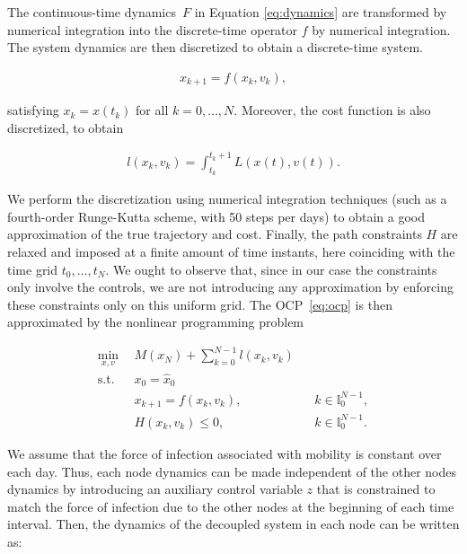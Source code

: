 The continuous-time dynamics~$F$ in Equation \eqref{eq:dynamics} are transformed by numerical integration into the discrete-time operator $f$ by numerical integration. The system dynamics are then discretized to obtain a discrete-time system.

\begin{align*}
    x_{k+1} = f(x_k,v_k),
\end{align*}

satisfying $x_k=x(t_k)$ for all $k=0,\ldots,N$. Moreover, the cost function is also discretized, to obtain

\begin{align*}
    l(x_k,v_k)=\int_{t_k}^{t_k+1} L(x(t),v(t)).
\end{align*}

We perform the discretization using numerical integration techniques (such as a fourth-order Runge-Kutta scheme, with 50 steps per days) to obtain a good approximation of the true trajectory and cost. Finally, the path constraints $H$ are relaxed and imposed at a finite amount of time instants, here coinciding with the time grid $t_0,\ldots,t_N$. We ought to observe that, since in our case the constraints only involve the controls, we are not introducing any approximation by enforcing these constraints only on this uniform grid. The OCP~\eqref{eq:ocp} is then approximated by the nonlinear programming problem

\begin{subequations}
    \begin{align}
        \min_{x,v} \ \ & M(x_N)+\sum_{k=0}^{N-1} l(x_k,v_k)  \\ 
        \mathrm{s.t.} \ \ & x_0 = \hat x_0 \\
        & x_{k+1} = f(x_k,v_k), && k\in \mathbb{I}_0^{N-1}, \\
        &H(x_k,v_k)\leq 0, && k\in \mathbb{I}_0^{N-1}.
    \end{align}
        \label{eq:ocp_nlp}
\end{subequations}

We assume that  the force of infection associated with mobility is constant over each day. Thus, each node dynamics can be made independent of the other nodes dynamics by introducing an auxiliary control variable $z$ that is constrained to match the force of infection due to the other nodes at the beginning of each time interval. Then, the dynamics of the decoupled system in each node can be written as:

